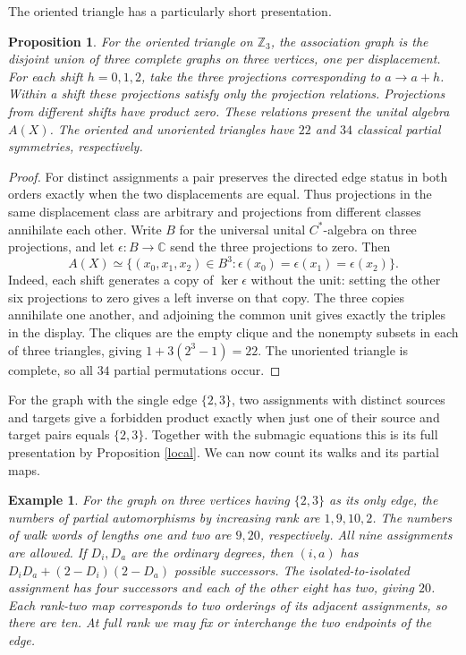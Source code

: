 \documentclass[11pt,a4paper]{article}
\newtheorem{prop}[thm]{Proposition}
\newtheorem{ex}[thm]{Example}
\begin{document}
The oriented triangle has a particularly short presentation.

\begin{prop}
For the oriented triangle on $\mathbb Z_3$, the association graph is the disjoint union of three complete graphs on three vertices, one per displacement. For each shift $h=0,1,2$, take the three projections corresponding to $a\to a+h$. Within a shift these projections satisfy only the projection relations. Projections from different shifts have product zero. These relations present the unital algebra $A(X)$. The oriented and unoriented triangles have $22$ and $34$ classical partial symmetries, respectively.
\end{prop}
\begin{proof}
For distinct assignments a pair preserves the directed edge status in both orders exactly when the two displacements are equal. Thus projections in the same displacement class are arbitrary and projections from different classes annihilate each other. Write $B$ for the universal unital $C^*$-algebra on three projections, and let $\epsilon:B\to\mathbb C$ send the three projections to zero. Then
\[
 A(X)\simeq\{(x_0,x_1,x_2)\in B^3:\epsilon(x_0)=\epsilon(x_1)=\epsilon(x_2)\}.
\]
Indeed, each shift generates a copy of $\ker\epsilon$ without the unit: setting the other six projections to zero gives a left inverse on that copy. The three copies annihilate one another, and adjoining the common unit gives exactly the triples in the display. The cliques are the empty clique and the nonempty subsets in each of three triangles, giving $1+3(2^3-1)=22$. The unoriented triangle is complete, so all $34$ partial permutations occur.
\end{proof}

For the graph with the single edge $\{2,3\}$, two assignments with distinct sources and targets give a forbidden product exactly when just one of their source and target pairs equals $\{2,3\}$. Together with the submagic equations this is its full presentation by Proposition \ref{local}. We can now count its walks and its partial maps.

\begin{ex}
For the graph on three vertices having $\{2,3\}$ as its only edge, the numbers of partial automorphisms by increasing rank are $1,9,10,2$. The numbers of walk words of lengths one and two are $9,20$, respectively. All nine assignments are allowed. If $D_i,D_a$ are the ordinary degrees, then $(i,a)$ has $D_i D_a+(2-D_i)(2-D_a)$ possible successors. The isolated-to-isolated assignment has four successors and each of the other eight has two, giving $20$. Each rank-two map corresponds to two orderings of its adjacent assignments, so there are ten. At full rank we may fix or interchange the two endpoints of the edge.
\end{ex}
\end{document}

